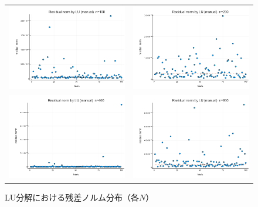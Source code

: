 \documentclass[a4paper,11pt]{ltjsarticle}
\begin{document}
\begin{figure}[H]
  \centering
  \begin{tabular}{cc}
    \includegraphics[width=72mm]{graphs/exp2_n100_residual.png} &
    \includegraphics[width=72mm]{graphs/exp2_n200_residual.png} \\
    \includegraphics[width=72mm]{graphs/exp2_n400_residual.png} &
    \includegraphics[width=72mm]{graphs/exp2_n800_residual.png} \\
    \end{tabular}
    \caption{LU分解における残差ノルム分布（各$N$）}
    \label{fig:exp2_residuals}
    \end{figure}
\end{document}
